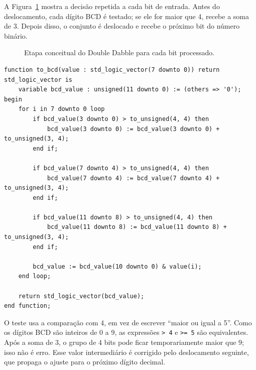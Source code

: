 \documentclass[12pt,a4paper]{book}
\begin{document}
A Figura~\ref{fig:double-dabble-etapa} mostra a decisão repetida a cada bit de entrada. Antes do deslocamento, cada dígito BCD é testado; se ele for maior que 4, recebe a soma de 3. Depois disso, o conjunto é deslocado e recebe o próximo bit do número binário.

\begin{figure}[h]
\centering
{}
\caption{Etapa conceitual do Double Dabble para cada bit processado.}
\label{fig:double-dabble-etapa}
\end{figure}

\begin{lstlisting}[caption={Função de conversão binário-BCD.}]
function to_bcd(value : std_logic_vector(7 downto 0)) return std_logic_vector is
    variable bcd_value : unsigned(11 downto 0) := (others => '0');
begin
    for i in 7 downto 0 loop
        if bcd_value(3 downto 0) > to_unsigned(4, 4) then
            bcd_value(3 downto 0) := bcd_value(3 downto 0) + to_unsigned(3, 4);
        end if;

        if bcd_value(7 downto 4) > to_unsigned(4, 4) then
            bcd_value(7 downto 4) := bcd_value(7 downto 4) + to_unsigned(3, 4);
        end if;

        if bcd_value(11 downto 8) > to_unsigned(4, 4) then
            bcd_value(11 downto 8) := bcd_value(11 downto 8) + to_unsigned(3, 4);
        end if;

        bcd_value := bcd_value(10 downto 0) & value(i);
    end loop;

    return std_logic_vector(bcd_value);
end function;
\end{lstlisting}

O teste usa a comparação com 4, em vez de escrever ``maior ou igual a 5''. Como os dígitos BCD são inteiros de 0 a 9, as expressões \texttt{> 4} e \texttt{>= 5} são equivalentes. Após a soma de 3, o grupo de 4 bits pode ficar temporariamente maior que 9; isso não é erro. Esse valor intermediário é corrigido pelo deslocamento seguinte, que propaga o ajuste para o próximo dígito decimal.
\end{document}
